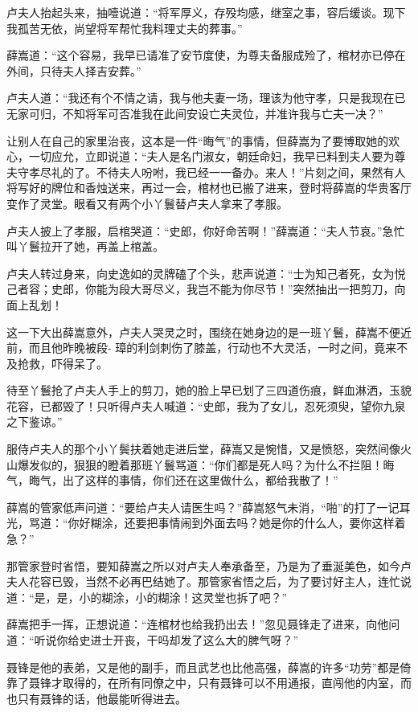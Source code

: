 \documentclass[12pt,oneside]{book}
\begin{document}
卢夫人抬起头来，抽噎说道：``将军厚义，存殁均感，继室之事，容后缓谈。现下我孤苦无依，尚望将军帮忙我料理丈夫的葬事。''

薛嵩道：``这个容易，我早已请准了安节度使，为尊夫备服成殓了，棺材亦已停在外间，只待夫人择吉安葬。''

卢夫人道：``我还有个不情之请，我与他夫妻一场，理该为他守孝，只是我现在已无家可归，不知将军可否准我在此间安设亡夫灵位，并准许我与亡夫一决？''

让别人在自己的家里治丧，这本是一件``晦气''的事情，但薛嵩为了要博取她的欢心，一切应允，立即说道：``夫人是名门淑女，朝廷命妇，我早已料到夫人要为尊夫守孝尽礼的了。不待夫人吩咐，我已经一一备办。来人！''片刻之间，果然有人将写好的牌位和香烛送来，再过一会，棺材也已搬了进来，登时将薛嵩的华贵客厅变作了灵堂。眼看又有两个小丫鬟替卢夫人拿来了孝服。

卢夫人披上了孝服，启棺哭道：``史郎，你好命苦啊！''薛嵩道：``夫人节哀。''急忙叫丫鬟拉开了她，再盖上棺盖。

卢夫人转过身来，向史逸如的灵牌磕了个头，悲声说道：``士为知己者死，女为悦己者容；史郎，你能为段大哥尽义，我岂不能为你尽节！''突然抽出一把剪刀，向面上乱划！

这一下大出薛嵩意外，卢夫人哭灵之时，围绕在她身边的是一班丫鬟，薛嵩不便近前，而且他昨晚被段-
璋的利剑刺伤了膝盖，行动也不大灵活，一时之间，竟来不及抢救，吓得呆了。

待至丫鬟抢了卢夫人手上的剪刀，她的脸上早已划了三四道伤痕，鲜血淋洒，玉貌花容，已都毁了！只听得卢夫人喊道：``史郎，我为了女儿，忍死须臾，望你九泉之下鉴谅。''

服侍卢夫人的那个小丫鬓扶着她走进后堂，薛嵩又是惋惜，又是愤怒，突然间像火山爆发似的，狠狠的瞪着那班丫鬟骂道：``你们都是死人吗？为什么不拦阻！晦气，晦气，出了这样的事情，你们还在这里做什么，都给我散了！''

薛嵩的管家低声问道：``要给卢夫人请医生吗？''薛嵩怒气未消，``啪''的打了一记耳光，骂道：``你好糊涂，还要把事情闹到外面去吗？她是你的什么人，要你这样着急？''

那管家登时省悟，要知薛嵩之所以对卢夫人奉承备至，乃是为了垂涎美色，如今卢夫人花容已毁，当然不必再巴结她了。那管家省悟之后，为了要讨好主人，连忙说道：``是，是，小的糊涂，小的糊涂！这灵堂也拆了吧？''

薛嵩把手一挥，正想说道：``连棺材也给我扔出去！''忽见聂锋走了进来，向他问道：``听说你给史进士开丧，干吗却发了这么大的脾气呀？''

聂锋是他的表弟，又是他的副手，而且武艺也比他高强，薛嵩的许多``功劳''都是倚靠了聂锋才取得的，在所有同僚之中，只有聂锋可以不用通报，直闯他的内室，而也只有聂锋的话，他最能听得进去。
\end{document}
